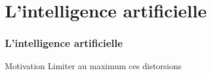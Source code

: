 \section{L'intelligence artificielle}
	\begin{frame}
		\frametitle{L'intelligence artificielle}
		\begin{block}{Motivation}
			Limiter au maximum ces distorsions
		\end{block}	
\end{frame}
